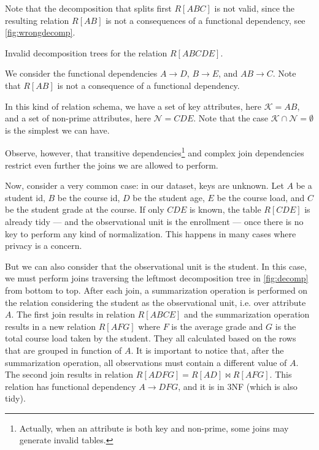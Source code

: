 Note that the decomposition that splits first $R[ABC]$ is not valid, since the resulting
relation $R[AB]$ is not a consequences of a functional dependency, see
\cref{fig:wrongdecomp}.

\begin{figurebox}[label=fig:wrongdecomp]{Invalid decomposition trees for the relation $R[ABCDE]$.}
  \centering
  \tcblower
  We consider the functional dependencies $A \to D$, $B \to E$, and $AB \to C$.
  Note that $R[AB]$ is not a consequence of a functional dependency.
\end{figurebox}

In this kind of relation schema, we have a set of key attributes, here $\mathcal{K} = AB$,
and a set of non-prime attributes, here $\mathcal{N} = CDE$.  Note that the case
$\mathcal{K} \cap \mathcal{N} = \emptyset$ is the simplest we can have.

Observe, however, that transitive dependencies\footnote{Actually, when an attribute is
both key and non-prime, some joins may generate invalid tables.} and complex join
dependencies restrict even further the joins we are allowed to perform.

Now, consider a very common case: in our dataset, keys are unknown.  Let $A$ be a student
id, $B$ be the course id, $D$ be the student age, $E$ be the course load, and $C$ be the
student grade at the course.  If only $CDE$ is known, the table $R[CDE]$ is already tidy
--- and the observational unit is the enrollment --- once there is no key to perform any
kind of normalization.  This happens in many cases where privacy is a concern.

But we can also consider that the observational unit is the student.  In this case, we
must perform joins traversing the leftmost decomposition tree in \cref{fig:decomp} from
bottom to top.  After each join, a summarization operation is performed on the relation
considering the student as the observational unit, i.e. over attribute $A$.  The first
join results in relation $R[ABCE]$ and the summarization operation results in a new
relation $R[AFG]$ where $F$ is the average grade and $G$ is the total course load taken by
the student.  They all calculated based on the rows that are grouped in function of $A$.
It is important to notice that, after the summarization operation, all observations must
contain a different value of $A$.  The second join results in relation $R[ADFG] = R[AD]
\bowtie R[AFG]$.  This relation has functional dependency $A \to DFG$, and it is in 3NF
(which is also tidy).

